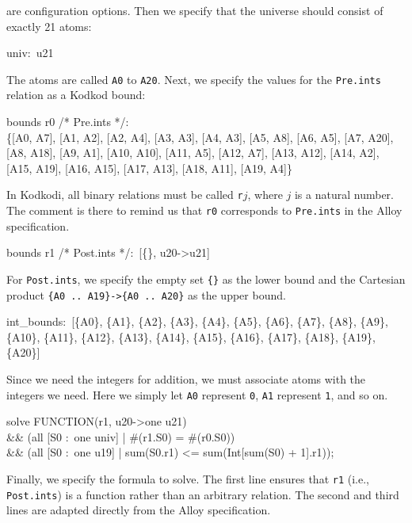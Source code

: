 \documentclass[a4paper,12pt]{article}
\begin{document}
\begin{enum}
        are configuration options. Then we specify that the universe should consist of
        exactly 21 atoms:

        \pre
        \ttfamily\small
        univ:~u21
        \post

        The atoms are called \texttt{A0} to \texttt{A20}. Next, we specify the values
        for the \texttt{Pre.ints} relation as a Kodkod bound:

        \pre
        \ttfamily\small
        bounds r0 /* Pre.ints */: \\
        \{[A0, A7], [A1, A2], [A2, A4], [A3, A3], [A4, A3], [A5, A8], [A6, A5],
        [A7, A20], [A8, A18], [A9, A1], [A10, A10], [A11, A5], [A12, A7], [A13, A12],
        [A14, A2], [A15, A19], [A16, A15], [A17, A13], [A18, A11], [A19, A4]\}
        \post

        In Kodkodi, all binary relations must be called \texttt{r$j$}, where $j$ is a
        natural number. The comment is there to remind us that \texttt{r0} corresponds
        to \texttt{Pre.ints} in the Alloy specification.

        \pre
        \ttfamily\small
        bounds r1 /* Post.ints */:~[\{\}, u20->u21]
        \post

        For \texttt{Post.ints}, we specify the empty set \texttt{\{\}} as the lower
        bound and the Cartesian product \texttt{\{A0 {..}~A19\}->\{A0 {.{.}}~A20\}} as
        the upper bound.

        \pre
        \ttfamily\small
        int\_bounds:~[\{A0\}, \{A1\}, \{A2\}, \{A3\}, \{A4\}, \{A5\}, \{A6\}, \{A7\},
        \{A8\}, \{A9\}, \{A10\}, \{A11\}, \{A12\}, \{A13\}, \{A14\}, \{A15\}, \{A16\},
        \{A17\}, \{A18\}, \{A19\}, \{A20\}]
        \post

        Since we need the integers for addition, we must associate atoms with the
        integers we need. Here we simply let \texttt{A0} represent \texttt{0},
        \texttt{A1} represent \texttt{1}, and so on.

        \pre
        \ttfamily\small
        solve FUNCTION(r1, u20->one u21) \\
        \&\& (all [S0 :~one univ] | \#(r1.S0) = \#(r0.S0)) \\
        \&\& (all [S0 :~one u19] | sum(S0.r1) <= sum(Int[sum(S0) + 1].r1));
        \post

        Finally, we specify the formula to solve. The first line ensures that
        \texttt{r1} (i.e., \texttt{Post.ints}) is a function rather than an arbitrary
        relation. The second and third lines are adapted directly from the Alloy
        specification.


\end{enum}
\end{document}
